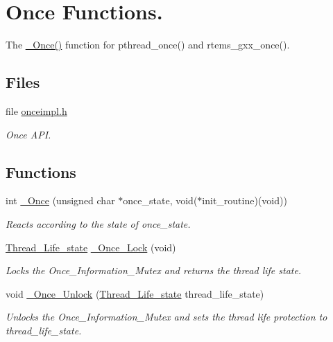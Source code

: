 \hypertarget{group__RTEMSScoreOnce}{}\section{Once Functions.}
\label{group__RTEMSScoreOnce}


The \mbox{\hyperlink{group__RTEMSScoreOnce_ga2db8aad33d5d118be8a81b4b32caea85}{\+\_\+\+Once()}} function for pthread\+\_\+once() and rtems\+\_\+gxx\+\_\+once().  


\subsection*{Files}
\begin{DoxyCompactItemize}
\item 
file \mbox{\hyperlink{onceimpl_8h}{onceimpl.\+h}}
\begin{DoxyCompactList}\small\item\em Once A\+PI. \end{DoxyCompactList}\end{DoxyCompactItemize}
\subsection*{Functions}
\begin{DoxyCompactItemize}
\item 
int \mbox{\hyperlink{group__RTEMSScoreOnce_ga2db8aad33d5d118be8a81b4b32caea85}{\+\_\+\+Once}} (unsigned char $\ast$once\+\_\+state, void($\ast$init\+\_\+routine)(void))
\begin{DoxyCompactList}\small\item\em Reacts according to the state of once\+\_\+state. \end{DoxyCompactList}\item 
\mbox{\hyperlink{group__RTEMSScoreThread_ga0b4c61e432a0c21855e3122bb394583d}{Thread\+\_\+\+Life\+\_\+state}} \mbox{\hyperlink{group__RTEMSScoreOnce_ga0af2868af507faa6429f26441dbea13c}{\+\_\+\+Once\+\_\+\+Lock}} (void)
\begin{DoxyCompactList}\small\item\em Locks the Once\+\_\+\+Information\+\_\+\+Mutex and returns the thread life state. \end{DoxyCompactList}\item 
void \mbox{\hyperlink{group__RTEMSScoreOnce_ga740a7de5e233c0d39a774f93c5e27b6e}{\+\_\+\+Once\+\_\+\+Unlock}} (\mbox{\hyperlink{group__RTEMSScoreThread_ga0b4c61e432a0c21855e3122bb394583d}{Thread\+\_\+\+Life\+\_\+state}} thread\+\_\+life\+\_\+state)
\begin{DoxyCompactList}\small\item\em Unlocks the Once\+\_\+\+Information\+\_\+\+Mutex and sets the thread life protection to thread\+\_\+life\+\_\+state. \end{DoxyCompactList}\end{DoxyCompactItemize}


